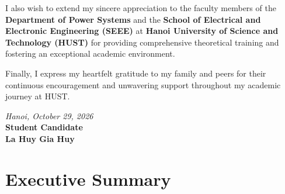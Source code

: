 \documentclass[12pt,a4paper,oneside]{report}
\begin{document}
I also wish to extend my sincere appreciation to the faculty members of the \textbf{Department of Power Systems} and the \textbf{School of Electrical and Electronic Engineering (SEEE)} at \textbf{Hanoi University of Science and Technology (HUST)} for providing comprehensive theoretical training and fostering an exceptional academic environment.

Finally, I express my heartfelt gratitude to my family and peers for their continuous encouragement and unwavering support throughout my academic journey at HUST.

\vspace{1.5cm}
\begin{flushright}
    \textit{Hanoi, October 29, 2026}\\[5pt]
    \textbf{Student Candidate}\\[30pt]
    \textbf{La Huy Gia Huy}
\end{flushright}

\newpage

\chapter*{Executive Summary}
\end{document}

